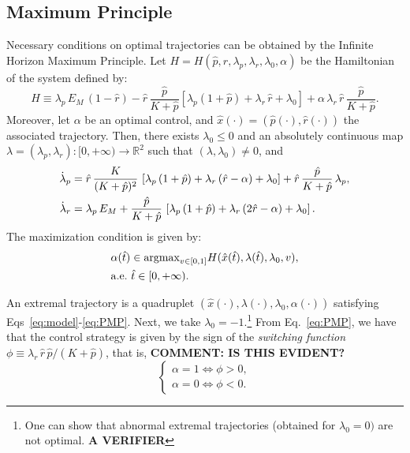 \subsection{Maximum Principle}
Necessary conditions on optimal trajectories can be obtained by the Infinite Horizon Maximum Principle\cite{carlson_infinite_1991}.
Let $H=H(\hat{p},\hat{r},\lambda_p,\lambda_r,\lambda_0,\alpha)$ be the Hamiltonian of the system defined by:
\[
H \equiv \lambda_p\, E_M\, (1-\hat{r}) - \hat{r}\, \dfrac{\hat{p}}{K+\hat{p}}\left[\lambda_p (1+\hat{p}) +\lambda_r\, \hat{r} +\lambda_0\right] + \alpha \, \lambda_r \, \hat{r}\, \frac{\hat{p}}{K+\hat{p}}.
\]
Moreover, let $\alpha$ be an optimal control, and $\hat{x}(\cdot)=(\hat{p}(\cdot),\hat{r}(\cdot))$ the associated trajectory.
Then, there exists $\lambda_0 \leq 0$ and an absolutely continuous map $\lambda=(\lambda_p,\lambda_r):[0,+\infty) \rightarrow \mathbb{R}^2$
such that $(\lambda,\lambda_0)\neq0$, and
\begin{align}{\label{eq:adjoint}}
\dot{\lambda}_p&= \hat{r} \, \frac{K}{(K+\hat{p})^2}\, \left[\lambda_p \, (1+\hat{p}) +\lambda_r\, ( \hat{r}-\alpha) + \lambda_0\right] + \hat{r}\, \frac{\hat{p}}{K+\hat{p}}\, \lambda_p,\\
 \dot{\lambda}_r&= \lambda_p\, E_M +\frac{\hat{p}}{K+\hat{p}} \, \left[\lambda_p \, (1+\hat{p}) +\lambda_r\, (2 \hat{r}-\alpha) +\lambda_0\right].
\end{align}
The maximization condition is given by:
\begin{equation}{\label{eq:PMP}}
\begin{aligned}
&\alpha(\hat{t}) \in \mathrm{argmax}_{v \in [0,1]} H(\hat{x}(\hat{t}),\lambda(\hat{t}),\lambda_0,v), \\ &\mathrm{a.e.} \ \hat{t}\in [0,+\infty).
\end{aligned}
\end{equation}

An extremal trajectory is a quadruplet $(\hat{x}(\cdot),\lambda(\cdot),\lambda_0,\alpha(\cdot))$ satisfying Eqs~\ref{eq:model}-\ref{eq:PMP}. 
Next, we take $\lambda_0=-1$.\footnote{One can show that abnormal extremal trajectories (obtained for $\lambda_0=0)$ are not optimal. \textbf{A VERIFIER}}
From Eq.~\ref{eq:PMP}, we have that the control strategy is given by the sign of the \textit{switching function} $\phi \equiv \lambda_r \, \hat{r}\, \hat{p}/(K+\hat{p})$, that is, \textbf{COMMENT: IS THIS EVIDENT?}
\[
\begin{cases}
\alpha=1 \iff \phi>0,\\
\alpha=0 \iff \phi<0.
\end{cases}
\]

